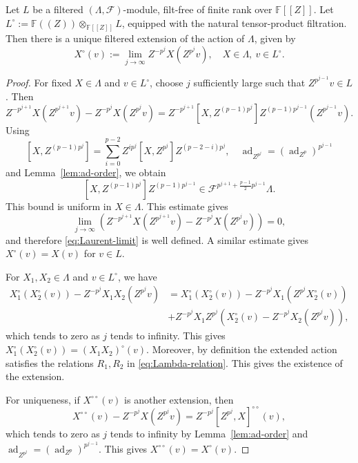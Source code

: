 \documentclass[11pt,a4paper]{article} %
\def\FF{\mathbb{F}}
\def\cF{\mathcal{F}}
\def\ad{\operatorname{ad}}
\begin{document}
\begin{proposition}\label{prop:Laurent-extension}
Let $L$ be a filtered $(\Lambda,\cF)$-module, filt-free of finite rank over $\FF[[Z]]$. Let $L^\circ:=\FF((Z))\otimes_{\FF[[Z]]}L$, equipped with the natural tensor-product filtration. Then there is a unique filtered extension of the action of $\Lambda$, given by
\begin{equation}\label{eq:Laurent-limit}
 X^{\circ}(v):=\lim_{j\to\infty}Z^{-p^j}X(Z^{p^j}v),\quad X\in\Lambda,~v\in L^\circ.
\end{equation}
\end{proposition}

\begin{proof}
    For fixed $X\in\Lambda$ and $v\in L^\circ$, choose $j$ sufficiently large such that $Z^{p^{j-1}}v\in L$. Then
    \[
    Z^{-p^{j+1}}X(Z^{p^{j+1}}v)-Z^{-p^j}X(Z^{p^j}v)=Z^{-p^{j+1}}[X,Z^{(p-1)p^j}]Z^{(p-1)p^{j-1}}(Z^{p^{j-1}}v).   
    \]
    Using 
    \[
    [X,Z^{(p-1)p^j}]=\sum_{i=0}^{p-2}Z^{ip^j}[X,Z^{p^j}]Z^{(p-2-i)p^j},\quad\ad_{Z^{p^j}}=(\ad_{Z^p})^{p^{j-1}}
    \]
    and Lemma~\ref{lem:ad-order}, we obtain 
    \[
    [X,Z^{(p-1)p^j}]Z^{(p-1)p^{j-1}}\in\cF^{p^{j+1}+\frac{p-1}{2}p^{j-1}}\Lambda.
    \]
    This bound is uniform in $X\in\Lambda$. This estimate gives 
    \[
    \lim_{j\to\infty}\left(Z^{-p^{j+1}}X(Z^{p^{j+1}}v)-Z^{-p^j}X(Z^{p^j}v)\right)=0,
    \]
    and therefore \eqref{eq:Laurent-limit} is well defined. A similar estimate gives $X^{\circ}(v)=X(v)$ for $v\in L$.
    
    For $X_1,X_2\in\Lambda$ and $v\in L^{\circ}$, we have 
    \begin{align*}
         X_1^{\circ}\left(X_2^{\circ}(v)\right)-Z^{-p^j}X_1X_2(Z^{p^j}v)&=X_1^{\circ}\left(X_2^{\circ}(v)\right)-Z^{-p^j}X_1\left(Z^{p^j}X_2^{\circ}(v)\right)\\
         &+Z^{-p^j}X_1Z^{p^j}\left(X_2^{\circ}(v)-Z^{-p^j}X_2(Z^{p^j}v)\right),
    \end{align*}
    which tends to zero as $j$ tends to infinity. This gives $  X_1^{\circ}\left(X_2^{\circ}(v)\right)=(X_1X_2)^{\circ}(v)$.
    Moreover, by definition the extended action satisfies the relations $R_1,R_2$ in \eqref{eq:Lambda-relation}. This gives the existence of the extension. 
    
    For uniqueness, if $X^{\circ\circ}(v)$ is another extension, then 
    \[
    X^{\circ\circ}(v)-Z^{-p^j}X(Z^{p^j}v)=Z^{-p^j}[Z^{p^j},X]^{\circ\circ}(v),
    \]
    which tends to zero as $j$ tends to infinity by Lemma~\ref{lem:ad-order} and $\ad_{Z^{p^j}}=(\ad_{Z^p})^{p^{j-1}}$. This gives $X^{\circ\circ}(v)=X^{\circ}(v)$.
    \end{proof}
    
\end{document}

